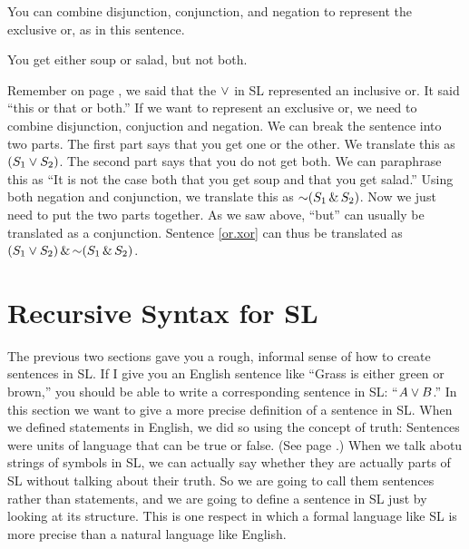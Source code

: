 You can combine disjunction, conjunction, and negation to represent the exclusive or, as in this sentence. 

\begin{earg}
\item[\ex{or.xor}] You get either soup or salad, but not both.
\end{earg}

Remember on page \pageref{def:inclusive_or}, we said that the $\vee$ in SL represented an inclusive or. It said ``this or that or both.'' If we want to represent an exclusive or, we need to combine disjunction, conjuction and negation. We can break the sentence into two parts. The first part says that you get one or the other. We translate this as $(S_1 \vee S_2)$. The second part says that you do not get both. We can paraphrase this as ``It is not the case both that you get soup and that you get salad.'' Using both negation and conjunction, we translate this as $\mathord{\sim}(S_1 \,\&\, S_2)$. Now we just need to put the two parts together. As we saw above, ``but'' can usually be translated as a conjunction. Sentence \ref{or.xor} can thus be translated as $(S_1 \vee S_2) \,\&\, \mathord{\sim}(S_1 \,\&\, S_2)$.


\label{recursive_syntax_for_SL}

\section{Recursive Syntax for SL} %

The previous two sections gave you a rough, informal sense of how to create sentences in SL. If I give you an English sentence like ``Grass is either green or brown,'' you should be able to write a corresponding sentence in SL: ``$A \vee B$.'' In this section we want to give a more precise definition of a sentence in SL.  When we defined statements in English, we did so using the concept of truth: Sentences were units of language that can be true or false. (See page \pageref{def:statement}.) When we talk abotu strings of symbols in SL, we can actually say whether they are actually parts of SL without talking about their truth. So we are going to call them sentences rather than statements, and we are going to define a sentence in SL just by looking at its structure. This is one respect in which a formal language like SL is more precise than a natural language like English.

